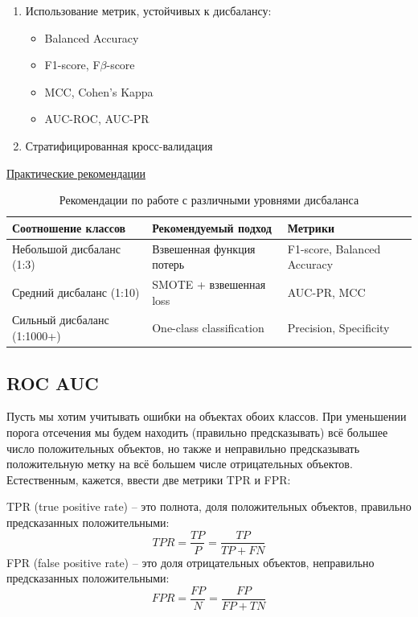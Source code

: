 \begin{enumerate}
    \item Использование метрик, устойчивых к дисбалансу:
    \begin{itemize}
        \item Balanced Accuracy
        \item F1-score, F$\beta$-score
        \item MCC, Cohen's Kappa
        \item AUC-ROC, AUC-PR
    \end{itemize}
    
    \item Стратифицированная кросс-валидация
\end{enumerate}

\underline{Практические рекомендации}

\begin{table}[h]
    \centering
    \begin{tabular}{|p{}|p{}|p{}|}
        \hline
        \textbf{Соотношение классов}      & \textbf{Рекомендуемый подход}  & \textbf{Метрики}            \\ \hline
        Небольшой дисбаланс (1:3)         & Взвешенная функция потерь      & F1-score, Balanced Accuracy \\ \hline
        Средний дисбаланс (1:10)          & SMOTE + взвешенная loss        & AUC-PR, MCC                 \\ \hline
        Сильный дисбаланс (1:1000+) & One-class classification       & Precision, Specificity      \\ \hline
    \end{tabular}
    \caption{Рекомендации по работе с различными уровнями дисбаланса}
    \label{tab:disbalance recs}
\end{table}

\subsection{ROC AUC}

Пусть мы хотим учитывать ошибки на объектах обоих классов.
При уменьшении порога отсечения мы будем находить (правильно предсказывать) всё большее число положительных
объектов, но также и неправильно предсказывать положительную метку на всё большем числе отрицательных объектов.
Естественным, кажется, ввести две метрики TPR и FPR:

TPR (true positive rate) -- это полнота, доля положительных объектов, правильно предсказанных положительными:
\[ TPR=\frac{TP}{P} = \frac{TP}{TP+FN} \]
FPR (false positive rate) -- это доля отрицательных объектов, неправильно предсказанных положительными:
\[ FPR = \frac{FP}{N} = \frac{FP}{FP+TN} \]

